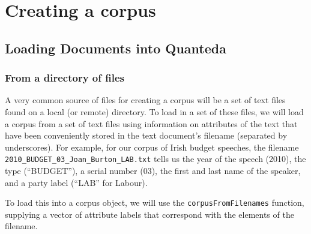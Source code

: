 \documentclass[11pt]{article}\usepackage[]{graphicx}\usepackage[]{color}
\begin{document}
\section{Creating a corpus}

\subsection{Loading Documents into Quanteda}

\subsubsection{From a directory of files}

A very common source of files for creating a corpus will be a set of
text files found on a local (or remote) directory.  To load in a set
of these files, we will load a corpus from a set of text files using
information on attributes of the text that have been conveniently
stored in the text document's filename (separated by underscores).
For example, for our corpus of Irish budget speeches, the filename
\texttt{2010\_BUDGET\_03\_Joan\_Burton\_LAB.txt} tells us the year of
the speech (2010), the type (``BUDGET''), a serial number (03), the
first and last name of the speaker, and a party label (``LAB'' for
Labour).

To load this into a corpus object, we will use the
\texttt{corpusFromFilenames} function, supplying a vector of attribute
labels that correspond with the elements of the filename.
\end{document}
